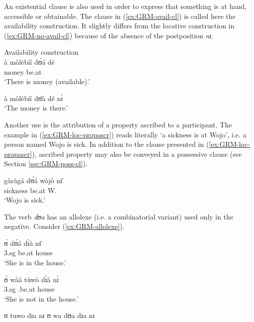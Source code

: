 An existential clause is also used in order to express that something is at
hand, accessible or obtainable. The clause in (\ref{ex:GRM-avail-cl}) is called
here 
the availability construction. It slightly differs from the
locative
construction in (\ref{ex:GRM-no-avail-cl}) because of  the absence of the
postposition
{\it nɪ}.

\ea\label{ex:GRM-avail-vs-loc}

\ea\label{ex:GRM-avail-cl}{\rm Availability construction}\\
\gll à mòlèbíí dʊ́á dé\\
{\art}  money be.at {\dem} \\
\glt  `There is money (available).'

\ex\label{ex:GRM-no-avail-cl}
à mòlèbíí dʊ̄ā dé nɪ̀\\
`The money is there.'

\z 
 \z


Another use is the attribution of a property ascribed to a participant. The
example in (\ref{ex:GRM-loc-propascr}) reads literally `a sickness is at Wojo', 
i.e. a person named Wojo is sick.  In addition to the clause presented in
(\ref{ex:GRM-loc-propascr}), ascribed property may also be conveyed in a
possessive clause (see Section \ref{sec:GRM-poss-cl}). 


\ea\label{ex:GRM-loc-propascr}
\gll gàràgá dʊ́á wòjò nɪ̄\\
sickness be.at W. {\postp}\\
\glt  `Wojo is sick.'
\z

 The
verb {\it dʊa} has an allolexe (i.e. a combinatorial variant) used only in the 
negative.
Consider (\ref{ex:GRM-allolexe}).

\ea\label{ex:GRM-allolexe}

\ea\label{ex:GRM-allolexe-pos}
\gll ʊ̀  dʊ́á dɪ̀à nɪ̄ \\
{\sc 3.sg} be.at house {\postp}\\
\glt  `She is in the house.'

\ex\label{ex:GRM-allolexe-neg}
\gll ʊ̀  wáá tùwò dɪ̀à nɪ̀ \\
{\sc 3.sg} {\neg} {\neg}.be.at house {\postp}\\
\glt  `She is not in the house.'


\ex\label{ex:GRM-allolexe-pos-out}
 \textasteriskcentered ʊ  tuwo dɪa nɪ
\ex\label{ex:GRM-allolexe-neg-out}
 \textasteriskcentered ʊ  wa dʊa dɪa nɪ

\z 
 \z




